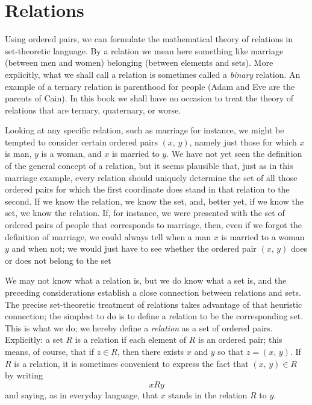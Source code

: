 \section{Relations}

Using ordered pairs, we can formulate the mathematical theory of relations in set-theoretic language. By a relation we mean here something like marriage (between men and women) belonging (between elements and sets). More explicitly, what we shall call a relation is sometimes called a \textit{binary} relation. An example of a ternary relation is parenthood for people (Adam and Eve are the parents of Cain). In this book we shall have no occasion to treat the theory of relations that are ternary, quaternary, or worse.

Looking at any specific relation, such as marriage for instance, we might be tempted to consider certain ordered pairs $(x, \, y)$, namely just those for which $x$ is man, $y$ is a woman, and $x$ is married to $y$. We have not yet seen the definition of the general concept of a relation, but it seems plausible that, just as in this marriage example, every relation should uniquely determine the set of all those ordered pairs for which the first coordinate does stand in that relation to the second. If we know the relation, we know the set, and, better yet, if we know the set, we know the relation. If, for instance, we were presented with the set of ordered pairs of people that corresponds to marriage, then, even if we forgot the definition of marriage, we could always tell when a man $x$ is married to a woman $y$ and when not; we would just have to see whether the ordered pair $(x, \, y)$ does or does not belong to the set

We may not know what a relation is, but we do know what a set is, and the preceding considerations establish a close connection between relations and sets. The precise set-theoretic treatment of relations takes advantage of that heuristic connection; the simplest to do is to define a relation to be the corresponding set. This is what we do; we hereby define a \textit{relation} as a set of ordered pairs. Explicitly: a set $R$ is a relation if each element of $R$ is an ordered pair; this means, of course, that if $z \in R$, then there exists $x$ and $y$ so that $z = (x, \, y)$. If $R$ is a relation, it is sometimes convenient to express the fact that $(x, \, y) \in R$ by writing
\[
	xRy
\]
and saying, as in everyday language, that $x$ stands in the relation $R$ to $y$.

